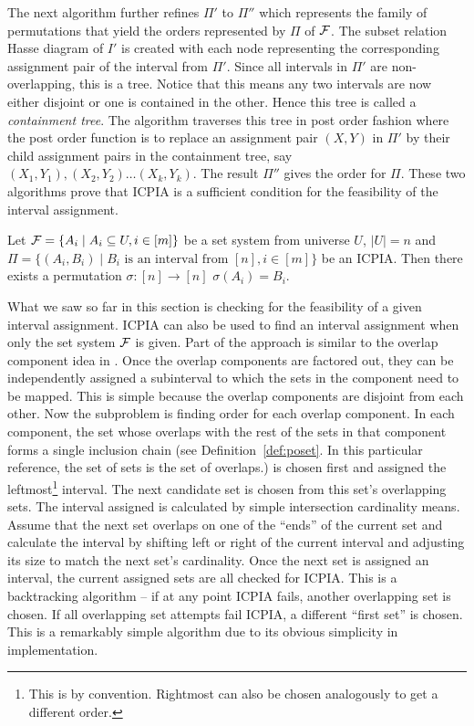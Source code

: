 The next algorithm \cite[Alg.~2]{nsnrs09} further refines $\Pi'$ to
$\Pi''$ which represents the family of permutations that yield the
\COP orders represented by $\Pi$ of ${\cal F}$. The subset relation Hasse
diagram of $I'$ is created with each node representing the
corresponding assignment pair of the interval from $\Pi'$. Since all intervals in
$\Pi'$ are non-overlapping, this is a tree. Notice that this means any
two intervals are now either disjoint or one is contained in the
other. Hence this tree is called a {\em containment tree}.  The
algorithm traverses this tree in post order fashion where the post
order function is to replace an assignment pair $(X,Y)$  in $\Pi'$ by their child
assignment pairs in the containment tree, say $(X_1, Y_1),(X_2, Y_2)
\ldots (X_k,Y_k)$. The result $\Pi''$ gives the
\COP order for $\Pi$. These two algorithms prove that ICPIA is a
sufficient condition for the feasibility of the interval assignment.

\begin{theoremsansproof}
  \label{th:icpia2}
  Let  ${\cal F} = \{A_i \mid A_i \subseteq U, i \in [m]\}$ be a set system
  from universe $U$, $|U| = n$
  and $\Pi = \{(A_i,B_i) \mid B_i \text{ is an interval from } [n], i
  \in [m]\}$ be an ICPIA. Then there exists a permutation $\sigma: [n]
  \rightarrow [n]$ \stt $\sigma(A_i) = B_i$.
\end{theoremsansproof}

What we saw so far in this section is checking for the feasibility of
a given interval assignment. ICPIA can also be used to find an
interval assignment when only the set system ${\cal F}$ is given. Part of
the approach is similar to the overlap component idea in \cite{fg65,
  wlh02}. Once the overlap components are factored out, they can be
independently assigned a subinterval to which the sets in the
component need to be mapped. This is simple because the overlap
components are disjoint from each other. Now the subproblem is finding
\COP order for each overlap component. In each component, the set
whose overlaps with the rest of the sets in that component forms a
single inclusion chain (see Definition~\ref{def:poset}. In this
particular reference, the set of sets is the set of overlaps.)  is
chosen first and assigned the leftmost\footnote{This is by
  convention. Rightmost can also be chosen analogously to get a
  different \COP order.} interval. The next candidate set is chosen
from this set's overlapping sets. The interval assigned is calculated
by simple intersection cardinality means. Assume that the next set
overlaps on one of the ``ends'' of the current set and calculate the
interval by shifting left or right of the current interval and
adjusting its size to match the next set's cardinality. Once the next
set is assigned an interval, the current assigned sets are all checked
for ICPIA. This is a backtracking algorithm -- if at any point ICPIA
fails, another overlapping set is chosen. If all overlapping set
attempts fail ICPIA, a different ``first set'' is chosen. This is a
remarkably simple algorithm due to its obvious simplicity in
implementation.

